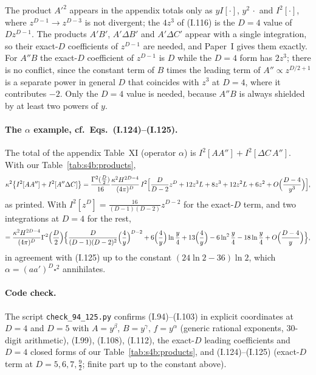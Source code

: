 \documentclass[aps,prd,onecolumn,10pt,nofootinbib,floatfix]{revtex4-2}
\newcommand{\PI}{Paper~I}
\newcommand{\eqI}[1]{(I.#1)}
\begin{document}
The product $A'^2$ appears in the appendix totals only as $yI[\cdot]$, $y^2\,\cdot$ and $I^2[\cdot]$, where $z^{D-1}\to z^{D-3}$ is
not divergent; the $4z^3$ of \eqI{116} is the $D=4$ value of $Dz^{D-1}$. The products $A'B'$, $A'\Delta B'$ and
$A'\Delta C'$ appear with a single integration, so their exact-$D$ coefficients of $z^{D-1}$ are needed, and \PI{}
gives them exactly. For $A''B$ the exact-$D$ coefficient of $z^{D-1}$ is $D$ while the $D=4$ form has $2z^3$; there is
no conflict, since the constant term of $B$ times the leading term of $A''\propto z^{D/2+1}$ is a separate power in
general $D$ that coincides with $z^3$ at $D=4$, where it contributes $-2$. Only the $D=4$ value is needed, because
$A''B$ is always shielded by at least two powers of $y$.

\paragraph*{The $\alpha$ example, cf.\ Eqs.~(I.124)--(I.125).}
The total of the appendix Table~XI (operator $\alpha$) is $I^2[AA'']+I^2[\Delta C\,A'']$. With
our Table~\ref{tab:s4b:products},
\begin{equation}
\kappa^2\big\{I^2[AA'']+I^2[A''\Delta C]\big\}=\frac{\Gamma^2(\frac D2)}{16}\frac{\kappa^2H^{2D-4}}{(4\pi)^D}\,
I^2\Big[\frac{D}{D-2}z^D+12z^3L+8z^3+12z^2L+6z^2+O\Big(\frac{D-4}{y^3}\Big)\Big],
\label{eq:s4b:I124}
\end{equation}
as printed. With $I^2[z^D]=\frac{16}{(D-1)(D-2)}z^{D-2}$ for the exact-$D$ term, and two integrations at $D=4$ for the
rest,
\begin{equation}
=\frac{\kappa^2H^{2D-4}}{(4\pi)^D}\Gamma^2\Big(\frac D2\Big)\Big\{\frac{D}{(D-1)(D-2)^2}\Big(\frac4y\Big)^{D-2}
+6\Big(\frac4y\Big)\ln\frac y4+13\Big(\frac4y\Big)-6\ln^2\frac y4-18\ln\frac y4+O\Big(\frac{D-4}{y}\Big)\Big\},
\label{eq:s4b:I125}
\end{equation}
in agreement with \eqI{125} up to the constant $(24\ln2-36)\ln2$, which $\alpha=(aa')^D\square^2$ annihilates.

\paragraph*{Code check.}
The script \texttt{check\_94\_125.py} confirms \eqI{94}--\eqI{103} in explicit coordinates at $D=4$ and $D=5$ with
$A=y^\beta$, $B=y^\gamma$, $f=y^\alpha$ (generic rational exponents, 30-digit arithmetic), \eqI{99}, \eqI{108},
\eqI{112}, the exact-$D$ leading coefficients and $D=4$ closed forms of our Table~\ref{tab:s4b:products}, and
\eqI{124}--\eqI{125} (exact-$D$ term at $D=5,6,7,\frac92$; finite part up to the constant above).
\end{document}
